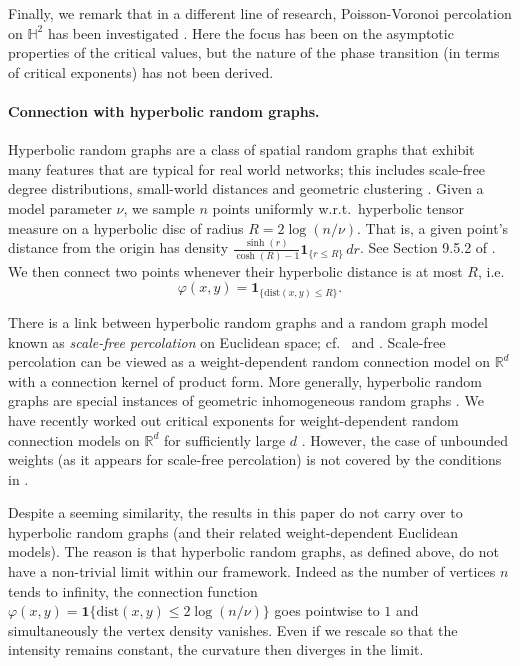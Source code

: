 \documentclass[10pt,a4paper,dvipsnames]{article}
\theoremstyle{definition}
\theoremstyle{remark}
\newcommand{\Rd}{\mathbb R^d}
\newcommand{\HypTwo}{{\mathbb{H}^2}}
\newcommand{\dist}[1]{\mathrm{dist}\left(#1\right)}
\newcommand{\connf}{\varphi}
\numberwithin{equation}{section}
\begin{document}
Finally, we remark that in a different line of research, Poisson-Voronoi percolation on $\HypTwo$ has been investigated \cite{BenjaSchra01,HansenMuller_2022_Voronoi}. Here the focus has been on the asymptotic properties of the critical values, but the nature of the phase transition (in terms of critical exponents) has not been derived. 
 

\paragraph{Connection with hyperbolic random graphs.}
Hyperbolic random graphs are a class of spatial random graphs that exhibit many features that are typical for real world networks; this includes scale-free degree distributions, small-world distances and geometric clustering \cite{krioukov2010hyperbolic}. Given a model parameter $\nu$, we sample $n$ points uniformly w.r.t.\ hyperbolic tensor measure on a hyperbolic disc of radius $R=2\log(n/\nu)$. That is, a given point's distance from the origin has density $\frac{\sinh(r)}{\cosh(R)-1}\mathbf{1}_{\{r\le R\}}\,dr$. See Section 9.5.2 of \cite{Hofstad2024random}. 
We then connect two points whenever their hyperbolic distance is at most $R$, i.e. \[\connf(x,y)=\mathbf{1}_{\{\dist{x,y}\le R\}}.\]

There is a link between hyperbolic random graphs and a random graph model known as \emph{scale-free percolation} on Euclidean space; cf.\ \cite{Lodewijks2020Explosion} and \cite[Theorem 9.31]{Hofstad2024random}. Scale-free percolation can be viewed as a weight-dependent random connection model on $\Rd$ with a connection kernel of product form. More generally, hyperbolic random graphs are special instances of geometric inhomogeneous random graphs \cite{BringKeuscLengl19}. We have recently worked out critical exponents for weight-dependent random connection models on $\Rd$ for sufficiently large $d$ \cite{DicHey2022triangle}. However, the case of unbounded weights (as it appears for scale-free percolation) is not covered by the conditions in \cite{DicHey2022triangle}. 

Despite a seeming similarity, the results in this paper do not carry over to hyperbolic random graphs (and their related weight-dependent Euclidean models). The reason is that hyperbolic random graphs, as defined above, do not have a non-trivial  limit within our framework. Indeed as the number of vertices $n$ tends to infinity, the connection function $\connf(x,y)=\mathbf{1}{\{\dist{x,y}\le 2\log(n/\nu)\}}$ goes pointwise to $1$ and simultaneously the vertex density vanishes. Even if we rescale so that the intensity remains constant, the curvature then diverges in the limit. 
\end{document}

